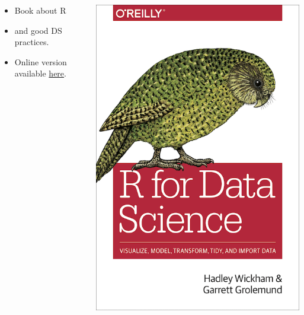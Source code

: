 \documentclass[12pt]{beamer}\usepackage[]{graphicx}\usepackage[]{color}
\begin{document}
\begin{frame}
\begin{columns}[T] %
\begin{column}{.48\textwidth}
\vspace{2cm}
 \begin{itemize}
  \item Book about R
  \item and good DS practices.
  \item Online version available \textcolor{orange}{\href{http://r4ds.had.co.nz/}{here}}.
 \end{itemize}
\end{column}%
\hfill%
\begin{column}{.48\textwidth}

 \includegraphics[width=\textwidth,height=\textheight,keepaspectratio]{./Images/02_rBook}
\end{column}%
\end{columns}
\end{frame}
\end{document}
